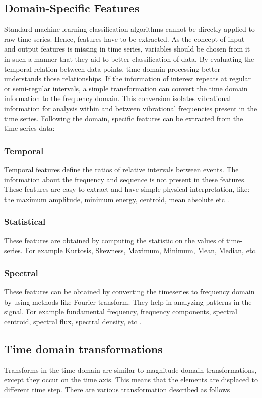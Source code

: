         \subsection{Domain-Specific Features}
     Standard machine learning classification algorithms cannot be directly applied to raw time series. Hence, features have to be extracted. As the concept of input and output features is missing in time series, variables should be chosen from it in such a manner that they aid to better classification of data. By evaluating the temporal relation between data points, time-domain processing better understands those relationships. If the information of interest repeats at regular or semi-regular intervals, a simple transformation can convert the time domain information to the frequency domain. This conversion isolates vibrational information for analysis within and between vibrational frequencies present in the time series. Following the domain, specific features can be extracted from the time-series data:
        
        \subsubsection{Temporal} 
        Temporal features define the ratios of relative intervals between events. The information about the frequency and sequence is not present in these features. These features are easy to extract and have simple physical interpretation, like: the maximum amplitude, minimum energy, centroid, mean absolute etc \cite{CakaNebi}.
         \subsubsection{Statistical} 
         These features are obtained by computing the statistic on the values of time-series. For example Kurtosis, Skewness, Maximum, Minimum, Mean, Median, etc.
         
          \subsubsection{Spectral} 
          These features can be obtained by converting the timeseries to frequency domain by using methods like Fourier transform. They help in analyzing patterns in the signal. For example fundamental frequency, frequency components, spectral centroid, spectral flux, spectral density, etc \cite{CakaNebi}.
        
    \subsection{Time domain transformations}
    Transforms in the time domain are similar to magnitude domain transformations, except they occur on the time axis. This means that the elements are displaced to different time step. There are various transformation described as follows
    
